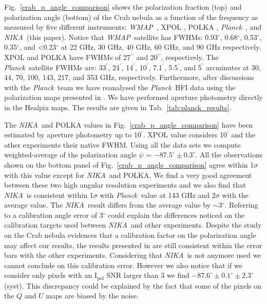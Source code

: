 \documentclass[twocolumn,traditabstract]{aa}
\def\NIKA{\textit{NIKA}}
\def\Planck{\textit{Planck}}
\def\WMAP{\textit{WMAP}}
\begin{document}
Fig.~\ref{crab_p_angle_comparison} shows the polarization fraction (top) and polarization angle (bottom) of the Crab nebula as a function of the frequency as measured by
five different instruments: 
\WMAP\ \citep{2011ApJS..192...19W}, XPOL \citep{aumont2010}, POLKA \citep{2014PASP..126.1027W}, \Planck\ \citep{2015arXiv150702058P}, and \NIKA\ (this paper). 
Notice that \WMAP\ satellite has FWHMs: 0.93$^{\circ}$, 0.68$^{\circ}$, 0.53$^{\circ}$, 0.35$^{\circ}$, and \textless 0.23$^{\circ}$ at 22 GHz, 30 GHz, 40 GHz, 60 GHz, and 90 GHz respectively. XPOL and POLKA have FWHMs of 27$^{\prime\prime}$ and 20$^{\prime\prime}$, respectively.
The \Planck\ satellite FWHMs are: 33$^{\prime}$, 24$^{\prime}$, 14$^{\prime}$, 10$^{\prime}$, 7.1$^{\prime}$, 5.5$^{\prime}$, and 5$^{\prime}$ arcminutes at 30, 44, 70, 100, 143, 217, and 353 GHz, respectively. Furthermore, after discussions with the \Planck\ team we have reanalysed the \Planck\ HFI data using the polarization maps presented in \cite{refId0}. We have performed aperture photometry directly in the Healpix maps. The results are given in Tab.~\ref{tab:planck_results}.

The \NIKA\ and POLKA values in Fig.~\ref{crab_p_angle_comparison} have been estimated by aperture photometry up to 10$^{\prime}$. XPOL value considers 10$^{\prime}$ \citep{aumont2010} and the other experiments their native FWHM.
Using all the data sets we compute weighted-average of the polarization angle $\psi$ = $-87.5^{\circ}\pm 0.3^{\circ}$.  
All the observations shown on the bottom panel of
Fig.~\ref{crab_p_angle_comparison} agree within 1$\sigma$ with this value except for \NIKA\ and POLKA.
We find a very good agreement between these two high angular resolution experiments and we also find that \NIKA\ is consistent within 1$\sigma$ with \Planck\ value at 143 GHz and 2$\sigma$ with the average value.
The \NIKA\ result differs from the average value by $\sim$3$^{\circ}$. 
Referring to \cite{ritacco2017} a calibration angle error of 3$^{\circ}$ could explain the differences noticed on the calibration targets used between \NIKA\ and other experiments. Despite the study on the Crab nebula evidences that a calibration factor on the polarization angle may affect our results, the results presented in \cite{ritacco2017} are still consistent within the error bars with the other experiments. Considering that \NIKA\ is not anymore used we cannot conclude on this calibration error.
However we also notice that if we consider only pixels with an $\textrm{I}_\textrm{pol}$ SNR larger than 3 we find $-87.6^{\circ} \pm 0.1^{\circ} \pm 2.3^{\circ}$(syst). This discrepancy could be explained by the fact that some of the pixels on the $Q$ and $U$ maps are biased by the noise.
  
\end{document}

